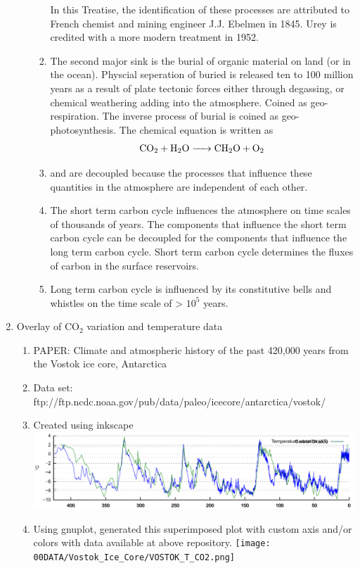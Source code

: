 \documentclass[final,10pt,reqno,twoside]{article}
\begin{document}
\begin{enumerate}[leftmargin=0cm, align=left]
\begin{enumerate}[label=\textbf{(\alph*})]
\begin{enumerate}
         		   In this Treatise, the identification of these processes are attributed to French chemist and mining engineer J.J. Ebelmen in 1845. Urey is credited with a more modern treatment in 1952.
         		\item The second major  sink is the burial of organic material on land (or in the ocean). Physcial seperation of buried  is released ten to 100 million years as a result of plate tectonic forces either through degassing, or chemical weathering adding  into the atmosphere. Coined as geo-respiration. The inverse process of burial is coined as geo-photosynthesis. The chemical equation is written as
         		    \begin{equation}
         		    	\ce{CO2 + H2O -> CH2O + O2}
         		    \end{equation}
         		\item {} and  are decoupled because the processes that influence these quantities in the atmosphere are independent of each other.
         		\item The short term carbon cycle influences the atmosphere on time scales of thousands of years. The components that influence the short term carbon cycle can be decoupled for the components that influence the long term carbon cycle. Short term carbon cycle determines the fluxes of carbon in the surface reservoirs.  
         		\item Long term carbon cycle is influenced by its constitutive bells and whistles on the time scale of > $10^5$ years.   
         	\end{enumerate}
         \end{enumerate}    
         \item Overlay of CO$_2$ variation and temperature data
            \begin{enumerate}[label=\textbf{(\alph*})]
            	\item PAPER: Climate and atmospheric history of the past 420,000 years from the Vostok ice core, Antarctica
            	\item Data set: ftp://ftp.ncdc.noaa.gov/pub/data/paleo/icecore/antarctica/vostok/
            	\item Created using inkscape \\
            	   \includegraphics{00FIGURES/Temperature_variation_and_CO2.png}
            	\item Using gnuplot, generated this superimposed plot with custom axis and/or colors with data available at above repository.
            	   \texttt{[image: 00DATA/Vostok\_Ice\_Core/VOSTOK\_T\_CO2.png]}
            \end{enumerate}
              

\end{enumerate}
\end{document}
